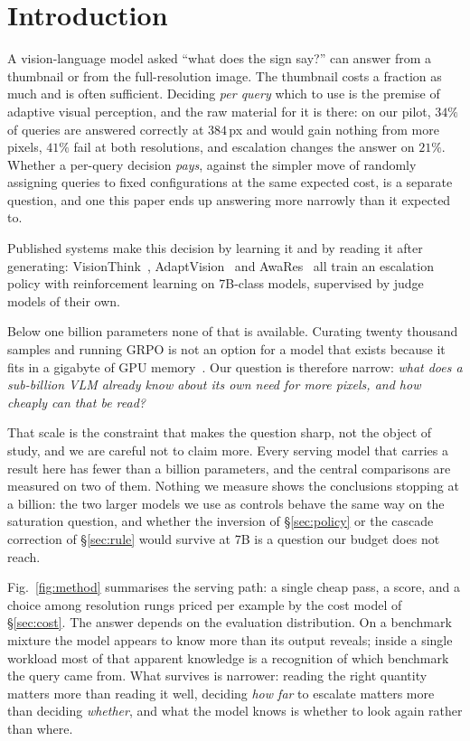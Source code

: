 \documentclass[10pt,twocolumn]{article}
\theoremstyle{plain}
\begin{document}
\section{Introduction}

A vision-language model asked ``what does the sign say?'' can answer from a
thumbnail or from the full-resolution image. The thumbnail costs a fraction as
much and is often sufficient. Deciding \emph{per query} which to use is the
premise of adaptive visual perception, and the raw material for it is there: on
our pilot, $34\%$ of queries are answered correctly at $384$\,px and would gain
nothing from more pixels, $41\%$ fail at both resolutions, and escalation
changes the answer on $21\%$. Whether a per-query decision \emph{pays},
against the simpler move of randomly assigning queries to fixed configurations
at the same expected cost, is a separate question, and one this paper ends up
answering more narrowly than it expected to.

Published systems make this decision by learning it and by reading it after
generating: VisionThink~\cite{visionthink}, AdaptVision~\cite{adaptvision} and
AwaRes~\cite{awares} all train an escalation policy with reinforcement learning
on 7B-class models, supervised by judge models of their own.

Below one billion parameters none of that is available. Curating twenty
thousand samples and running GRPO is not an option for a model that exists
because it fits in a gigabyte of GPU memory~\cite{smolvlm}. Our question is
therefore narrow: \emph{what does a sub-billion VLM already know about its own
need for more pixels, and how cheaply can that be read?}

That scale is the constraint that makes the question sharp, not the object of
study, and we are careful not to claim more. Every serving model that carries a
result here has fewer than a billion parameters, and the central comparisons
are measured on two of them. Nothing we measure shows the conclusions stopping
at a billion: the two larger models we use as controls behave the same way on
the saturation question, and whether the inversion of \S\ref{sec:policy} or the
cascade correction of \S\ref{sec:rule} would survive at 7B is a question our
budget does not reach.

Fig.~\ref{fig:method} summarises the serving path: a single cheap pass, a
score, and a choice among resolution rungs priced per example by the cost
model of \S\ref{sec:cost}. The
answer depends on the evaluation distribution. On a benchmark mixture the model
appears to know more than its output reveals; inside a single workload most of
that apparent knowledge is a recognition of which benchmark the query came
from. What survives is narrower: reading
the right quantity matters more than reading it well, deciding \emph{how far} to
escalate matters more than deciding \emph{whether}, and what the model knows is
whether to look again rather than where.
\end{document}
